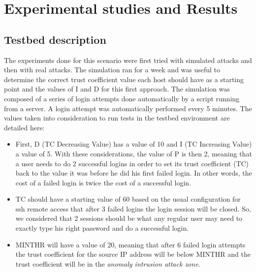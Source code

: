 \documentclass[conference]{IEEEtran}
\begin{document}
\section{Experimental studies and Results}\label{exp}

\subsection{Testbed description}
The experiments done for this scenario were first tried with simulated attacks and then with real attacks. The simulation ran for a week and was useful to determine the correct trust coefficient value each host should have as a starting point and the values of I and D for this first approach. The simulation was composed of a series of login attempts done automatically by a script running from a server. A login attempt was automatically performed every 5 minutes. The values taken into consideration to run tests in the testbed environment are detailed here: 
\begin{itemize}
\item First, D (TC Decreasing Value) has a value of 10 and I (TC Increasing Value) a value of 5. With these considerations, the value of P is then 2, meaning that a user needs to do 2 successful logins in order to set its trust coefficient (TC) back to the value it was before he did his first failed login. In other words, the cost of a failed login is twice the cost of a successful login. 
\item TC should have a starting value of 60 based on the usual configuration for ssh remote access that after 3 failed logins the login session will be closed. So, we considered that 2 sessions should be what any regular user may need to exactly type his right password and do a successful login.
\item MINTHR will have a value of 20, meaning that after 6 failed login attempts the trust coefficient for the source IP address will be below MINTHR and the trust coefficient will be in the \emph{anomaly intrusion attack zone}.
\end{itemize}
\end{document}
